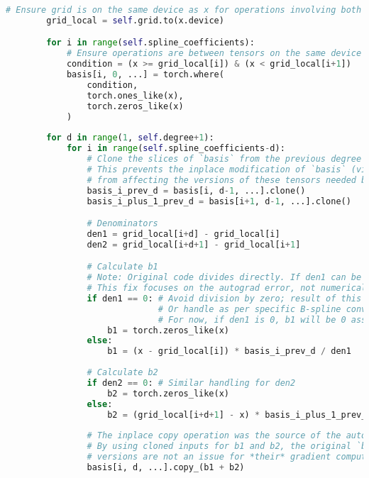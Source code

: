 \begin{lstlisting}[language=Python]
        # Ensure grid is on the same device as x for operations involving both
        grid_local = self.grid.to(x.device)

        for i in range(self.spline_coefficients):
            # Ensure operations are between tensors on the same device
            condition = (x >= grid_local[i]) & (x < grid_local[i+1])
            basis[i, 0, ...] = torch.where(
                condition,
                torch.ones_like(x), 
                torch.zeros_like(x)
            )
        
        for d in range(1, self.degree+1):
            for i in range(self.spline_coefficients-d):
                # Clone the slices of `basis` from the previous degree (d-1) before using them.
                # This prevents the inplace modification of `basis` (via .copy_ below)
                # from affecting the versions of these tensors needed by autograd.
                basis_i_prev_d = basis[i, d-1, ...].clone()
                basis_i_plus_1_prev_d = basis[i+1, d-1, ...].clone()

                # Denominators
                den1 = grid_local[i+d] - grid_local[i]
                den2 = grid_local[i+d+1] - grid_local[i+1]

                # Calculate b1
                # Note: Original code divides directly. If den1 can be zero, this can lead to inf/nan.
                # This fix focuses on the autograd error, not numerical stability of division by zero.
                if den1 == 0: # Avoid division by zero; result of this term is effectively 0 if numerator is finite.
                              # Or handle as per specific B-spline convention for coincident knots.
                              # For now, if den1 is 0, b1 will be 0 assuming basis_i_prev_d is not inf/nan.
                    b1 = torch.zeros_like(x)
                else:
                    b1 = (x - grid_local[i]) * basis_i_prev_d / den1
                
                # Calculate b2
                if den2 == 0: # Similar handling for den2
                    b2 = torch.zeros_like(x)
                else:
                    b2 = (grid_local[i+d+1] - x) * basis_i_plus_1_prev_d / den2
                
                # The inplace copy operation was the source of the autograd error.
                # By using cloned inputs for b1 and b2, the original `basis` tensor's
                # versions are not an issue for *their* gradient computation.
                basis[i, d, ...].copy_(b1 + b2)
        

\end{lstlisting}
